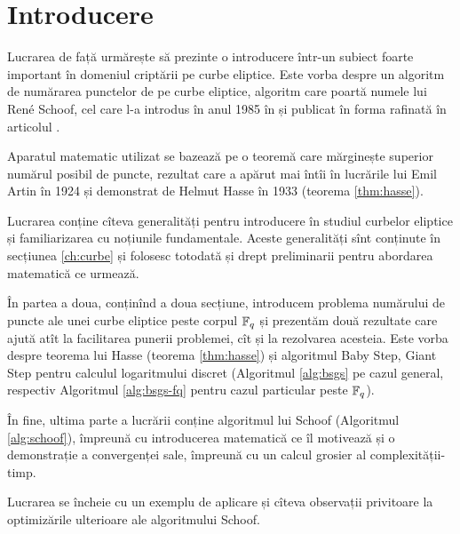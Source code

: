 
\chapter*{Introducere}

\indent\indent Lucrarea de față urmărește să prezinte o introducere într-un subiect
foarte important în domeniul criptării pe curbe eliptice. Este vorba
despre un algoritm de numărarea punctelor de pe curbe eliptice,
algoritm care poartă numele lui Ren\'e Schoof, cel care l-a introdus
în anul 1985 în \cite{Schoof1985EllipticCO} și publicat în forma 
rafinată în articolul \cite{JTNB_1995__7_1_219_0}.

Aparatul matematic utilizat se bazează pe o teoremă care mărginește
superior numărul posibil de puncte, rezultat care a apărut mai întîi
în lucrările lui Emil Artin în 1924 și demonstrat de Helmut Hasse
în 1933 (teorema \ref{thm:hasse}).

Lucrarea conține cîteva generalități pentru introducere în studiul
curbelor eliptice și familiarizarea cu noțiunile fundamentale.
Aceste generalități sînt conținute în secțiunea \ref{ch:curbe}
și folosesc totodată și drept preliminarii pentru abordarea
matematică ce urmează.

În partea a doua, conținînd a doua secțiune, introducem problema
numărului de puncte ale unei curbe eliptice peste corpul $ \mathbb{F}_q $
și prezentăm două rezultate care ajută atît la facilitarea punerii
problemei, cît și la rezolvarea acesteia. Este vorba despre
teorema lui Hasse (teorema \ref{thm:hasse}) și algoritmul
Baby Step, Giant Step pentru calculul logaritmului discret
(Algoritmul \ref{alg:bsgs} pe cazul general, respectiv Algoritmul
\ref{alg:bsgs-fq} pentru cazul particular peste $ \mathbb{F}_q $).

În fine, ultima parte a lucrării conține algoritmul lui Schoof
(Algoritmul \ref{alg:schoof}), împreună cu introducerea matematică
ce îl motivează și o demonstrație a convergenței sale, împreună
cu un calcul grosier al complexității-timp.

Lucrarea se încheie cu un exemplu de aplicare și cîteva observații
privitoare la optimizările ulterioare ale algoritmului Schoof.

